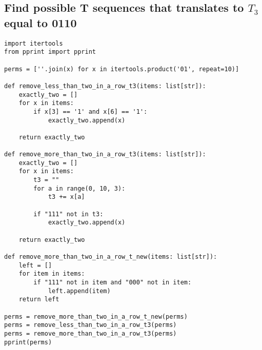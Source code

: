 \documentclass[12pt]{article}
\begin{document}
\subsection{Find possible T sequences that translates to $T_3$ equal to 0110}
\begin{lstlisting}[caption={Find possible T sequences that translates to $T_3$ equal to 0110}]
import itertools
from pprint import pprint

perms = [''.join(x) for x in itertools.product('01', repeat=10)]

def remove_less_than_two_in_a_row_t3(items: list[str]):
    exactly_two = []
    for x in items:
        if x[3] == '1' and x[6] == '1':
            exactly_two.append(x)

    return exactly_two

def remove_more_than_two_in_a_row_t3(items: list[str]):
    exactly_two = []
    for x in items:
        t3 = ""
        for a in range(0, 10, 3):
            t3 += x[a]

        if "111" not in t3:
            exactly_two.append(x)

    return exactly_two

def remove_more_than_two_in_a_row_t_new(items: list[str]):
    left = []
    for item in items:
        if "111" not in item and "000" not in item:
            left.append(item)
    return left

perms = remove_more_than_two_in_a_row_t_new(perms)
perms = remove_less_than_two_in_a_row_t3(perms)
perms = remove_more_than_two_in_a_row_t3(perms)
pprint(perms)
\end{lstlisting}
\end{document}
